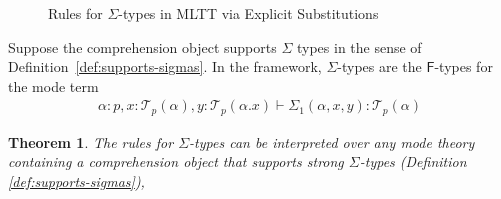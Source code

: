 \documentclass[10pt]{article}
\newtheorem{theorem}{Theorem}
\theoremstyle{definition}
\newcommand{\yields}{\vdash}
\newcommand\El[2]{\mathcal{T}_{#1}(#2)}
\begin{document}
\begin{figure}
\caption{Rules for $\Sigma$-types in MLTT via Explicit Substitutions}\label{fig:qit-sigma-rules}
\end{figure}

Suppose the comprehension object supports $\Sigma$ types in the sense of Definition~\ref{def:supports-sigmas}. In the framework, $\Sigma$-types are the $\mathsf{F}$-types for the mode term
\begin{align*}
\alpha : p, x : \El{p}{\alpha}, y : \El{p}{\alpha.x} \yields \Sigma_1(\alpha,x,y) : \El{p}{\alpha}
\end{align*}

\begin{theorem}
The rules for $\Sigma$-types can be interpreted over any mode theory containing a comprehension object that supports strong $\Sigma$-types (Definition \ref{def:supports-sigmas}), 
\end{theorem}
\end{document}
